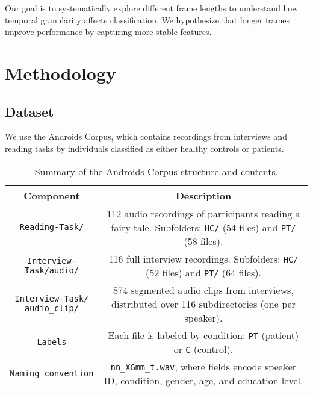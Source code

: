 \documentclass[conference]{IEEEtran}
\begin{document}
Our goal is to systematically explore different frame lengths to understand how temporal granularity affects classification. We hypothesize that longer frames improve performance by capturing more stable features.

\section{Methodology}

\subsection{Dataset}
We use the Androids Corpus, which contains recordings from interviews and reading tasks by individuals classified as either healthy controls or patients.
\begin{table}[h]
\centering
\caption{Summary of the Androids Corpus structure and contents.}
\begin{tabular}{|c|c|}
\hline
\textbf{Component} & \textbf{Description} \\
\hline
\texttt{Reading-Task/} & 112 audio recordings of participants reading a fairy tale. Subfolders: \texttt{HC/} (54 files) and \texttt{PT/} (58 files). \\
\hline
\texttt{Interview-Task/audio/} & 116 full interview recordings. Subfolders: \texttt{HC/} (52 files) and \texttt{PT/} (64 files). \\
\hline
\texttt{Interview-Task/} \newline \texttt{audio\_clip/} & 874 segmented audio clips from interviews, distributed over 116 subdirectories (one per speaker). \\
\hline
\texttt{Labels} & Each file is labeled by condition: \texttt{PT} (patient) or \texttt{C} (control). \\
\hline
\texttt{Naming convention} & \texttt{nn\_XGmm\_t.wav}, where fields encode speaker ID, condition, gender, age, and education level. \\
\hline
\end{tabular}
\label{tab:androids_summary}
\end{table}
\end{document}
